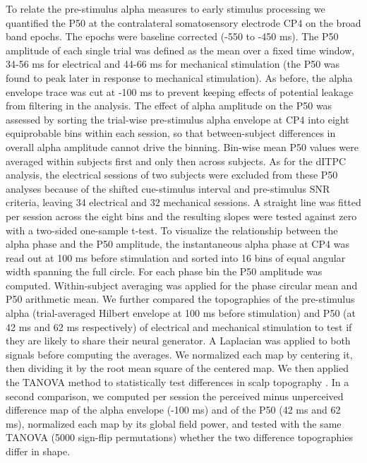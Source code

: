 \documentclass[11pt,a4paper,onecolumn]{article}
\begin{document}
To relate the pre-stimulus alpha measures to early stimulus processing we quantified the P50 at the contralateral somatosensory electrode CP4 on the broad band epochs. The epochs were baseline corrected (-550 to -450 ms). The P50 amplitude of each single trial was defined as the mean over a fixed time window, 34-56 ms for electrical and 44-66 ms for mechanical stimulation (the P50 was found to peak later in response to mechanical stimulation). As before, the alpha envelope trace was cut at -100 ms to prevent keeping effects of potential leakage from filtering in the analysis. The effect of alpha amplitude on the P50 was assessed by sorting the trial-wise pre-stimulus alpha envelope at CP4 into eight equiprobable bins within each session, so that between-subject differences in overall alpha amplitude cannot drive the binning. Bin-wise mean P50 values were averaged within subjects first and only then across subjects. As for the dITPC analysis, the electrical sessions of two subjects were excluded from these P50 analyses because of the shifted cue-stimulus interval and pre-stimulus SNR criteria, leaving 34 electrical and 32 mechanical sessions. A straight line was fitted per session across the eight bins and the resulting slopes were tested against zero with a two-sided one-sample t-test. 
To visualize the relationship between the alpha phase and the P50 amplitude, the instantaneous alpha phase at CP4 was read out at 100 ms before stimulation and sorted into 16 bins of equal angular width spanning the full circle. For each phase bin the P50 amplitude was computed. Within-subject averaging was applied for the phase circular mean and P50 arithmetic mean.
We further compared the topographies of the pre-stimulus alpha (trial-averaged Hilbert envelope at 100 ms before stimulation) and P50 (at 42 ms and 62 ms respectively) of electrical and mechanical stimulation to test if they are likely to share their neural generator.
A Laplacian was applied to both signals before computing the averages. We normalized each map by centering it, then dividing it by the root mean square of the centered map.   
We then applied the TANOVA method to statistically test differences in scalp topography \cite{murrayTopographicERPAnalyses2008}. In a second comparison, we computed per session the perceived minus unperceived difference map of the alpha envelope (-100 ms) and of the P50 (42 ms and 62 ms), normalized each map by its global field power, and tested with the same TANOVA (5000 sign-flip permutations) whether the two difference topographies differ in shape. 
\end{document}
